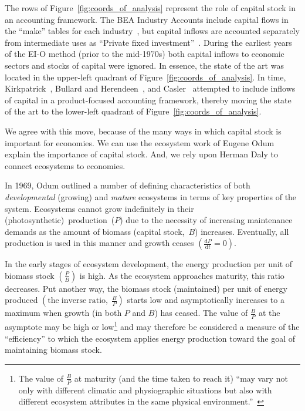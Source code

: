 The rows of Figure~\ref{fig:coords_of_analysis}
represent the role of capital stock in an accounting framework.
The BEA Industry Accounts include capital flows in the ``make''
tables for each industry~\cite[Table~1]{Streitwieser:2011aa}, 
but capital inflows are accounted separately 
from intermediate uses as 
``Private fixed invest­ment''~\cite[Table~2]{Streitwieser:2011aa}.
During the earliest years of the EI-O method 
(prior to the mid-1970s) 
both capital inflows to economic sectors 
and stocks of capital were ignored.
In essence, the state of the art was located in the upper-left quadrant
of Figure~\ref{fig:coords_of_analysis}.
In time, Kirkpatrick~\cite{Kirkpatrick:1974te}, 
Bullard and Herendeen~\cite{Bullard-III:1975aa},
and Casler~\cite{Casler:1983uy} attempted to 
include inflows of capital in a product-focused
accounting framework, thereby moving the state of the art 
to the lower-left quadrant of Figure~\ref{fig:coords_of_analysis}.

We agree with this move, because of the many ways in which
capital stock is important for economies.
We can use the ecosystem work of Eugene Odum 
explain the importance of capital stock.
And, we rely upon Herman Daly to connect
ecosystems to economies.

In 1969, Odum outlined a number of 
defining characteristics of both \emph{developmental}
(growing) and \emph{mature} ecosystems in terms of key
properties of the system.\cite{Odum1969}
Ecosystems cannot
grow indefinitely in their (photosynthetic)~production~($P$)
due to the necessity of increasing maintenance
demands as the amount of biomass (capital
stock,~$B$) increases.
Eventually, all production is used in this manner
and growth ceases 
$\left(\frac{\mathrm{d}P}{\mathrm{d}t} = 0\right)$.

In the early stages of ecosystem development,
the energy production per unit of biomass stock $\left( \frac{P}{B} \right)$
is high.
As the ecosystem approaches maturity,
this ratio decreases.
Put another way,
the biomass stock (maintained) per unit of energy produced
$\left( \mathrm{the \; inverse \; ratio, \;} \frac{B}{P} \right)$
starts low and asymptotically increases to a maximum
when growth (in both $P$ and $B$) has ceased. 
The value of $\frac{B}{P}$ at the asymptote may be high or low\footnote{The
	value of $\frac{B}{P}$ at maturity (and the time taken to reach it)
	``may vary not only with different climatic 
	and physiographic situations but also with
	different ecosystem attributes in the same physical 
	environment.''~\cite[p.263]{Odum1969}}
and may therefore be considered a measure of 
the ``efficiency'' to which the ecosystem applies
energy production toward
the goal of maintaining biomass stock.
 
